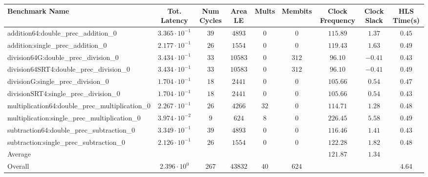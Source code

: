 \begin{tabular}{|l|c|c|c|c|c|c|c|c|}
\hline
Benchmark Name                                   & Tot. Latency            & Num Cycles & Area LE   & Mults  & Membits & Clock Frequency & Clock Slack & HLS Time(s) \\
\hline
addition64:double\_prec\_addition\_0             & $ 3.365 \cdot 10^{-1} $ & $ 39     $ & $ 4893  $ & $ 0  $ & $ 0   $ & $ 115.89      $ & $ 1.37    $ & $ 0.45    $ \\
addition:single\_prec\_addition\_0               & $ 2.177 \cdot 10^{-1} $ & $ 26     $ & $ 1554  $ & $ 0  $ & $ 0   $ & $ 119.43      $ & $ 1.63    $ & $ 0.49    $ \\
division64G:double\_prec\_division\_0            & $ 3.434 \cdot 10^{-1} $ & $ 33     $ & $ 10583 $ & $ 0  $ & $ 312 $ & $ 96.10       $ & $ -0.41   $ & $ 0.43    $ \\
division64SRT4:double\_prec\_division\_0         & $ 3.434 \cdot 10^{-1} $ & $ 33     $ & $ 10583 $ & $ 0  $ & $ 312 $ & $ 96.10       $ & $ -0.41   $ & $ 0.49    $ \\
divisionG:single\_prec\_division\_0              & $ 1.704 \cdot 10^{-1} $ & $ 18     $ & $ 2441  $ & $ 0  $ & $ 0   $ & $ 105.66      $ & $ 0.54    $ & $ 0.47    $ \\
divisionSRT4:single\_prec\_division\_0           & $ 1.704 \cdot 10^{-1} $ & $ 18     $ & $ 2441  $ & $ 0  $ & $ 0   $ & $ 105.66      $ & $ 0.54    $ & $ 0.43    $ \\
multiplication64:double\_prec\_multiplication\_0 & $ 2.267 \cdot 10^{-1} $ & $ 26     $ & $ 4266  $ & $ 32 $ & $ 0   $ & $ 114.71      $ & $ 1.28    $ & $ 0.48    $ \\
multiplication:single\_prec\_multiplication\_0   & $ 3.974 \cdot 10^{-2} $ & $ 9      $ & $ 624   $ & $ 8  $ & $ 0   $ & $ 226.45      $ & $ 5.58    $ & $ 0.49    $ \\
subtraction64:double\_prec\_subtraction\_0       & $ 3.349 \cdot 10^{-1} $ & $ 39     $ & $ 4893  $ & $ 0  $ & $ 0   $ & $ 116.46      $ & $ 1.41    $ & $ 0.43    $ \\
subtraction:single\_prec\_subtraction\_0         & $ 2.126 \cdot 10^{-1} $ & $ 26     $ & $ 1554  $ & $ 0  $ & $ 0   $ & $ 122.28      $ & $ 1.82    $ & $ 0.48    $ \\
\hline
Average                                          & $                     $ & $        $ & $       $ & $    $ & $     $ & $ 121.87      $ & $ 1.34    $ & $         $ \\
\hline
Overall                                          & $ 2.396 \cdot 10^{0}  $ & $ 267    $ & $ 43832 $ & $ 40 $ & $ 624 $ & $             $ & $         $ & $ 4.64    $ \\
\hline
\end{tabular}
